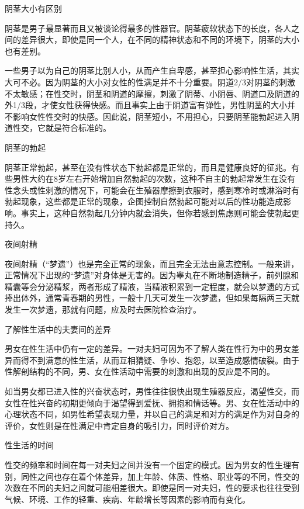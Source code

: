 \documentclass[12pt,UTF8,openany]{ctexbook}
\begin{document}
阴茎大小有区别


阴茎是男子最显著而且又被谈论得最多的性器官。阴茎疲软状态下的长度，各人之间的差异很大，即使是同一个人，在不同的精神状态和不同的环境下，阴茎的大小也有差别。

一些男子以为自己的阴茎比别人小，从而产生自卑感，甚至担心影响性生活，其实大可不必。因为阴茎的大小对女性的性满足并不十分重要。阴道2/3对阴茎的刺激不太敏感；在性交时，阴茎和阴道的摩擦，刺激了阴蒂、小阴唇、阴道口及阴道的外1/3段，才使女性获得快感。而且事实上由于阴道富有弹性，男性阴茎的大小并不影响女性性交时的快感。因此说，阴茎短小，不用担心，只要阴茎能勃起进入阴道性交，它就是符合标准的。





阴茎的勃起


阴茎正常勃起，甚至在没有性状态下勃起都是正常的，而且是健康良好的征兆。有些男性大约在8岁左右开始增加自然勃起的次数，这种不自主的勃起常发生在没有性念头或性刺激的情况下，可能会在生殖器摩擦到衣服时，感到寒冷时或淋浴时有勃起现象，这些都是正常的现象，企图控制自然勃起可能对以后的性功能造成影响。事实上，这种自然勃起几分钟内就会消失，但你若感到焦虑则可能会使勃起更持久。





夜间射精


夜间射精（“梦遗”）也是完全正常的现象，而且完全无法由意志控制。一般来讲，正常情况下出现的“梦遗”对身体是无害的。因为睾丸在不断地制造精子，前列腺和精囊等会分泌精浆，两者形成了精液，当精液积累到一定程度，就会以梦遗的方式捧出体外，通常青春期的男性，一般十几天可发生一次梦遗，但如果每隔两三天就发生一次梦遗，那就有问题，应及时去医院检查治疗。





了解性生活中的夫妻间的差异


男女在性生活中仍有一定的差异。一对夫妇可因为不了解人类在性行为中的男女差异而得不到满意的性生活，从而互相猜疑、争吵、抱怨，以至造成感情破裂。由于性解剖结构的不同，男、女在性活动中需要的刺激和出现的反应是不同的。

如当男女都已进入性的兴奋状态时，男性往往很快出现生殖器反应，渴望性交，而女性在性兴奋的初期更倾向于渴望得到爱抚、拥抱和情话等。男、女在性活动中的心理状态不同，如男性希望表现力量，并以自己的满足和对方的满足作为对自身的评价，女性则是在性满足中肯定自身的吸引力，同时评价对方。





性生活的时间


性交的频率和时间在每一对夫妇之间并没有一个固定的模式。因为男女的性生理有别，同性之间也存在着个体差异，加上年龄、体质、性格、职业等的不同，性交的次数在不同的夫妇之间就可能相差很大。即使是同一对夫妇，性的要求也往往受到气候、环境、工作的轻重、疾病、年龄增长等因素的影响而有变化。
\end{document}
